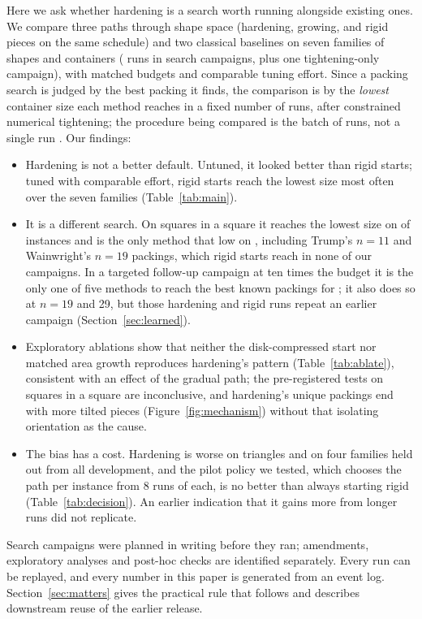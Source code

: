 Here we ask whether hardening is a search worth running alongside existing ones. We compare three paths through shape space (hardening, growing, and rigid pieces on the same schedule) and two classical baselines on seven families of shapes and containers (\totalruns{} runs in \ncampaigns{} search campaigns, plus one tightening-only campaign), with matched budgets and comparable tuning effort. Since a packing search is judged by the best packing it finds, the comparison is by the \emph{lowest} container size each method reaches in a fixed number of runs, after constrained numerical tightening; the procedure being compared is the batch of runs, not a single run \cite{Birattari2005}. Our findings:
\begin{itemize}\itemsep1pt
\item Hardening is not a better default. Untuned, it looked better than rigid starts; tuned with comparable effort, rigid starts reach the lowest size most often over the seven families (Table~\ref{tab:main}).
\item It is a different search. On squares in a square it reaches the lowest size on \CsevenSquInSquHardenLowest{} of \CsevenSquInSquN{} instances and is the only method that low on \CsevenSquInSquHardenSole, including Trump's $n=11$ and Wainwright's $n=19$ packings, which rigid starts reach in none of our campaigns. In a targeted follow-up campaign at ten times the budget it is the only one of five methods to reach the best known packings for \LongHardenOnlyReachedNewNs; it also does so at $n=19$ and 29, but those hardening and rigid runs repeat an earlier campaign (Section~\ref{sec:learned}).
\item Exploratory ablations show that neither the disk-compressed start nor matched area growth reproduces hardening's pattern (Table~\ref{tab:ablate}), consistent with an effect of the gradual path; the pre-registered tests on squares in a square are inconclusive, and hardening's unique packings end with more tilted pieces (Figure~\ref{fig:mechanism}) without that isolating orientation as the cause.
\item The bias has a cost. Hardening is worse on triangles and on four families held out from all development, and the pilot policy we tested, which chooses the path per instance from 8 runs of each, is no better than always starting rigid (Table~\ref{tab:decision}). An earlier indication that it gains more from longer runs did not replicate.
\end{itemize}
Search campaigns were planned in writing before they ran; amendments, exploratory analyses and post-hoc checks are identified separately. Every run can be replayed, and every number in this paper is generated from an event log. Section~\ref{sec:matters} gives the practical rule that follows and describes downstream reuse of the earlier release.
